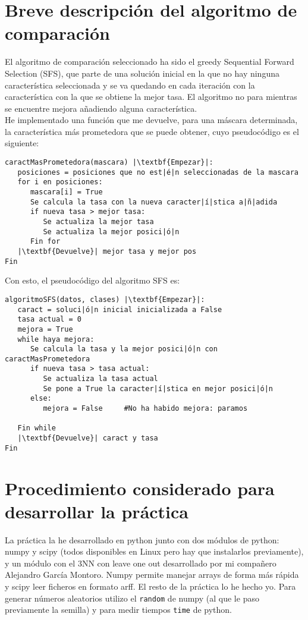 \documentclass[12pt]{article}
\begin{document}
\newpage

\section{Breve descripción del algoritmo de comparación}
El algoritmo de comparación seleccionado ha sido el greedy Sequential Forward Selection (SFS), que parte de una solución inicial en la que no hay ninguna característica seleccionada y se va quedando en cada iteración con la característica con la que se obtiene la mejor tasa. El algoritmo no para mientras se encuentre mejora añadiendo alguna característica.\\
He implementado una función que me devuelve, para una máscara determinada, la característica más prometedora que se puede obtener, cuyo pseudocódigo es el siguiente:
\begin{lstlisting}
caractMasPrometedora(mascara) |\textbf{Empezar}|:
   posiciones = posiciones que no est|é|n seleccionadas de la mascara
   for i en posiciones:
      mascara[i] = True
      Se calcula la tasa con la nueva caracter|í|stica a|ñ|adida
      if nueva tasa > mejor tasa:
         Se actualiza la mejor tasa
         Se actualiza la mejor posici|ó|n
      Fin for
   |\textbf{Devuelve}| mejor tasa y mejor pos
Fin
\end{lstlisting}

Con esto, el pseudocódigo del algoritmo SFS es:
\begin{lstlisting}
algoritmoSFS(datos, clases) |\textbf{Empezar}|:
   caract = soluci|ó|n inicial inicializada a False
   tasa actual = 0
   mejora = True
   while haya mejora:
      Se calcula la tasa y la mejor posici|ó|n con caractMasPrometedora
      if nueva tasa > tasa actual:
         Se actualiza la tasa actual
         Se pone a True la caracter|í|stica en mejor posici|ó|n
      else:
         mejora = False		#No ha habido mejora: paramos
      
   Fin while
   |\textbf{Devuelve}| caract y tasa
Fin

\end{lstlisting}

\newpage

\section{Procedimiento considerado para desarrollar la práctica}
La práctica la he desarrollado en python junto con dos módulos de python: numpy y scipy (todos disponibles en Linux pero hay que instalarlos previamente), y un módulo con el 3NN con leave one out desarrollado por mi compañero Alejandro García Montoro. Numpy permite manejar arrays de forma más rápida y scipy leer ficheros en formato arff. El resto de la práctica lo he hecho yo. Para generar números aleatorios utilizo el \texttt{random} de numpy (al que le paso previamente la semilla) y para medir tiempos \texttt{time} de python.\\
\end{document}
